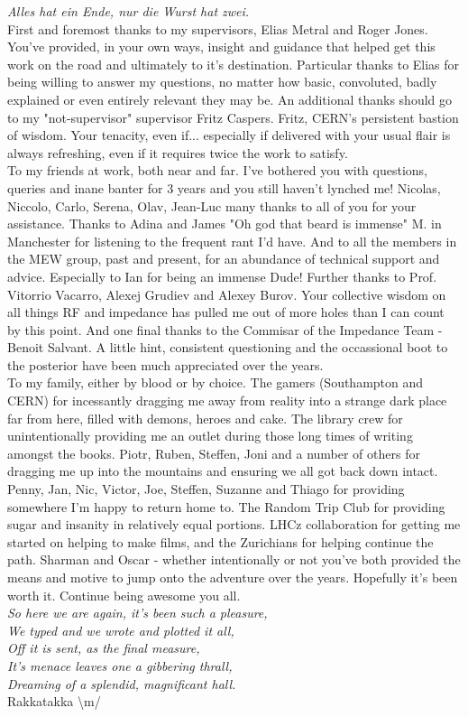 
\emph{Alles hat ein Ende, nur die Wurst hat zwei.}
\\
First and foremost thanks to my supervisors, Elias Metral and Roger Jones. You've provided, in your own ways, insight and guidance that helped get this work on the road and ultimately to it's destination. Particular thanks to Elias for being willing to answer my questions, no matter how basic, convoluted, badly explained or even entirely relevant they may be. An additional thanks should go to my "not-supervisor" supervisor Fritz Caspers. Fritz, CERN's persistent bastion of wisdom. Your tenacity, even if... especially if delivered with your usual flair is always refreshing, even if it requires twice the work to satisfy.
\\
To my friends at work, both near and far. I've bothered you with questions, queries and inane banter for 3 years and you still haven't lynched me! Nicolas, Niccolo, Carlo, Serena, Olav, Jean-Luc many thanks to all of you for your assistance. Thanks to Adina and James "Oh god that beard is immense" M. in Manchester for listening to the frequent rant I'd have. And to all the members in the MEW group, past and present, for an abundance of technical support and advice. Especially to Ian for being an immense Dude! Further thanks to Prof. Vitorrio Vacarro, Alexej Grudiev and Alexey Burov. Your collective wisdom on all things RF and impedance has pulled me out of more holes than I can count by this point. And one final thanks to the Commisar of the Impedance Team - Benoit Salvant. A little hint, consistent questioning and the occassional boot to the posterior have been much appreciated over the years.
\\
To my family, either by blood or by choice. The gamers (Southampton and CERN) for incessantly dragging me away from reality into a strange dark place far from here, filled with demons, heroes and cake. The library crew for unintentionally providing me an outlet during those long times of writing amongst the books. Piotr, Ruben, Steffen, Joni and a number of others for dragging me up into the mountains and ensuring we all got back down intact. Penny, Jan, Nic, Victor, Joe, Steffen, Suzanne and Thiago for providing somewhere I'm happy to return home to. The Random Trip Club for providing sugar and insanity in relatively equal portions. LHCz collaboration for getting me started on helping to make films, and the Zurichians for helping continue the path. Sharman and Oscar - whether intentionally or not you've both provided the means and motive to jump onto the adventure over the years. Hopefully it's been worth it. Continue being awesome you all.
\\
\emph{So here we are again, it's been such a pleasure,
\\
We typed and we wrote and plotted it all,
\\ 
Off it is sent, as the final measure,
\\
It's menace leaves one a gibbering thrall,
\\
Dreaming of a splendid, magnificant hall.}
\\ Rakkatakka \textbackslash{}m/